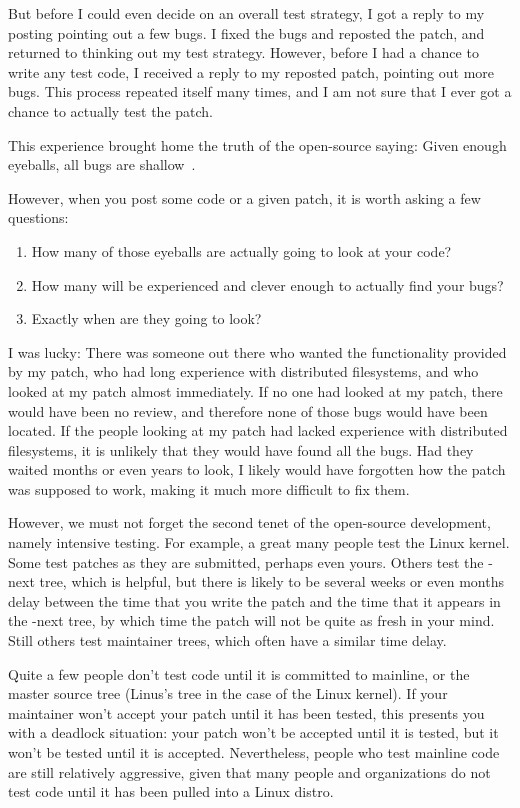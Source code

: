 But before I could even decide on an overall test strategy, I got a
reply to my posting pointing out a few bugs.
I fixed the bugs and reposted the patch, and returned to thinking
out my test strategy.
However, before I had a chance to write any test code, I received
a reply to my reposted patch, pointing out more bugs.
This process repeated itself many times, and I am not sure that I
ever got a chance to actually test the patch.

This experience brought home the truth of the open-source saying:
Given enough eyeballs, all bugs are shallow~\cite{EricSRaymond99b}.

However, when you post some code or a given patch, it is worth
asking a few questions:

\begin{enumerate}
\item	How many of those eyeballs are actually going to look at your code?
\item	How many will be experienced and clever enough to actually find
	your bugs?
\item	Exactly when are they going to look?
\end{enumerate}

I was lucky:  There was someone out there who wanted the functionality
provided by my patch, who had long experience with distributed filesystems,
and who looked at my patch almost immediately.
If no one had looked at my patch, there would have been no review, and
therefore none of those bugs would have been located.
If the people looking at my patch had lacked experience with distributed
filesystems, it is unlikely that they would have found all the bugs.
Had they waited months or even years to look, I likely would have forgotten
how the patch was supposed to work, making it much more difficult to
fix them.

However, we must not forget the second tenet of the open-source development,
namely intensive testing.
For example, a great many people test the Linux kernel.
Some test patches as they are submitted, perhaps even yours.
Others test the -next tree, which is helpful, but there is likely to be
several weeks or even months delay between the time that you write the
patch and the time that it appears in the -next tree, by which time the
patch will not be quite as fresh in your mind.
Still others test maintainer trees, which often have a similar time delay.

Quite a few people don't test code until it is committed to mainline,
or the master source tree (Linus's tree in the case of the Linux kernel).
If your maintainer won't accept your patch until it has been tested,
this presents you with a deadlock situation: your patch won't be accepted
until it is tested, but it won't be tested until it is accepted.
Nevertheless, people who test mainline code are still relatively
aggressive, given that many people and organizations do not test code
until it has been pulled into a Linux distro.

